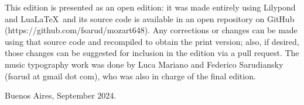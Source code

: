 This edition is presented as an open edition: it was made entirely using Lilypond and Lua\LaTeX\ and its source code is available in an open repository on GitHub (https://github.com/fsarud/mozart648). Any corrections or changes can be made using that source code and recompiled to obtain the print version; also, if desired, those changes can be suggested for inclusion in the edition via a pull request. The music typography work was done by Luca Mariano and Federico Sarudiansky (fsarud at gmail dot com), who was also in charge of the final edition. 

Buenos Aires, September 2024.
